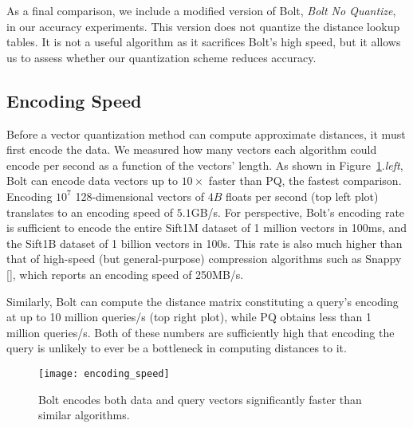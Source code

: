 As a final comparison, we include a modified version of Bolt, \textit{Bolt No Quantize}, in our accuracy experiments. This version does not quantize the distance lookup tables. It is not a useful algorithm as it sacrifices Bolt's high speed, but it allows us to assess whether our quantization scheme reduces accuracy.

\subsection{Encoding Speed}
Before a vector quantization method can compute approximate distances, it must first encode the data. We measured how many vectors each algorithm could encode per second as a function of the vectors' length. As shown in Figure~\ref{fig:encoding_speeds}.\textit{left}, Bolt can encode data vectors up to $10\times$ faster than PQ, the fastest comparison. Encoding $10^7$ 128-dimensional vectors of $4B$ floats per second (top left plot) translates to an encoding speed of $5.1$GB/s. For perspective, Bolt's encoding rate is sufficient to encode the entire Sift1M dataset of 1 million vectors in 100ms, and the Sift1B dataset of 1 billion vectors in 100s. This rate is also much higher than that of high-speed (but general-purpose) compression algorithms such as Snappy [], which reports an encoding speed of 250MB/s.

Similarly, Bolt can compute the distance matrix constituting a query's encoding at up to 10 million queries/s (top right plot), while PQ obtains less than 1 million queries/s. Both of these numbers are sufficiently high that encoding the query is unlikely to ever be a bottleneck in computing distances to it.

\begin{figure}[h]
\begin{center}
\texttt{[image: encoding\_speed]}
\vspace*{-1mm}
\caption{Bolt encodes both data and query vectors significantly faster than similar algorithms.}
\label{fig:encoding_speeds}
\end{center}
\end{figure}

